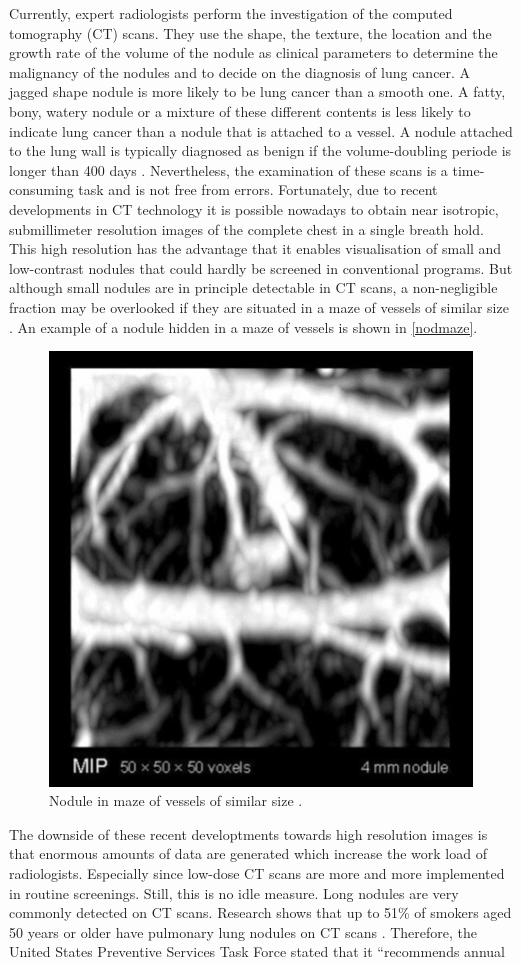 Currently, expert radiologists perform the investigation of the computed
tomography (CT) scans. They use the shape, the texture, the location and the
growth rate of the volume of the nodule as clinical parameters to determine the
malignancy of the nodules and to decide on the diagnosis of lung cancer. A
jagged shape nodule is more likely to be lung cancer than a smooth one. A fatty,
bony, watery nodule or a mixture of these different contents is less likely to
indicate lung cancer than a nodule that is attached to a vessel. A nodule
attached to the lung wall is typically diagnosed as benign if the
volume-doubling periode is longer than 400 days \cite{wu}. Nevertheless, the
examination of these scans is a time-consuming task and is not free from errors.
Fortunately, due to recent developments in CT technology it is possible nowadays
to obtain near isotropic, submillimeter resolution images of the complete chest
in a single breath hold. This high resolution has the advantage that it enables
visualisation of small and low-contrast nodules that could hardly be screened in
conventional programs. But although small nodules are in principle detectable in
CT scans, a non-negligible fraction may be overlooked if they are situated in a
maze of vessels of similar size \cite{ozekes}. An example of a nodule hidden in
a maze of vessels is shown in \autoref{nodmaze}.
\begin{figure}[htp]
\begin{center}
  \includegraphics[width= 30 mm]{img/noduleMaze.png}
  \caption{Nodule in maze of vessels of similar size \cite{noduleMaze}.}
  \label{nodmaze}
\end{center}
\end{figure}
The downside of these recent developtments towards high resolution images is
that enormous amounts of data are generated which increase the work load of radiologists.
Especially since low-dose CT scans are more and more implemented in routine
screenings. Still, this is no idle measure. Long nodules are very commonly
detected on CT scans. Research shows that up to 51\% of smokers aged 50 years or
older have pulmonary lung nodules on CT scans \cite{mahon}. Therefore, the
United States Preventive Services Task Force stated that it ``recommends annual
